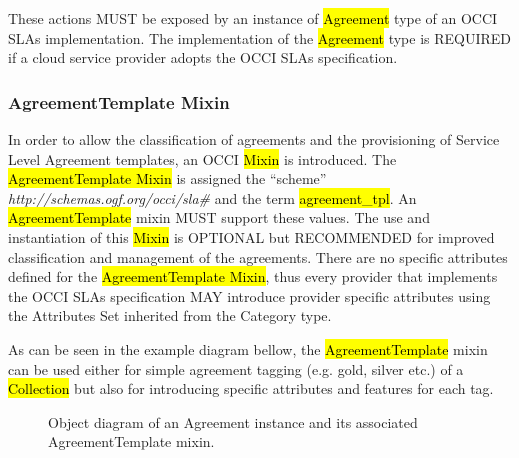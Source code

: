 \documentclass[10pt,a4paper]{article}
\begin{document}
These actions MUST be exposed by an instance of \hl{Agreement} type of an OCCI SLAs implementation. The implementation of the \hl{Agreement} type is REQUIRED if a cloud service provider adopts the OCCI SLAs specification.


\subsubsection{AgreementTemplate Mixin}
In order to allow the classification of agreements and the provisioning of Service Level Agreement templates, an OCCI \hl{Mixin} is introduced. The \hl{AgreementTemplate Mixin} is assigned the “scheme” \textit{http://schemas.ogf.org/occi/sla\#} and the term \hl{agreement\_tpl}. An \hl{AgreementTemplate} mixin MUST support these values. The use and instantiation of this \hl{Mixin} is OPTIONAL but RECOMMENDED for improved classification and management of the agreements.  There are no specific attributes defined for the \hl{AgreementTemplate Mixin}, thus every provider that implements the OCCI SLAs specification MAY introduce provider specific attributes using the Attributes Set inherited from the Category type.

As can be seen in the example diagram bellow, the \hl{AgreementTemplate} mixin can be used either for simple agreement tagging (e.g. gold, silver etc.) of a \hl{Collection} but also for introducing specific attributes and features for each tag.

\begin{figure}[!h]
	{\centering {} \par}
	\caption{Object diagram of an Agreement instance and its associated AgreementTemplate mixin.}
	\label{fig:template-example}
\end{figure}
\end{document}
